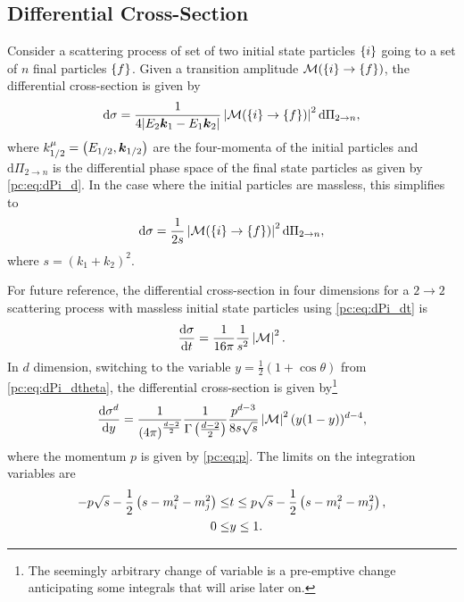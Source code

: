 \documentclass[../main.tex]{subfiles}
\begin{document}
\subsection{Differential Cross-Section}
Consider a scattering process of set of two initial state particles \(\left\{i\right\}\) going to a set of \(n\) final particles \(\left\{f\right\}\).
Given a transition amplitude \(\mathcal{M}(\left\{i\right\} \to \left\{f\right\})\), the differential cross-section is given by~\cite{Schwartz:2014sze}
\begin{equation}
  \mathrm{d}\sigma = \frac{1}{4|E_2 \boldsymbol{k}_1 - E_1\boldsymbol{k}_2|} \left|\mathcal{M}(\left\{i\right\} \to \left\{f\right\})\right|^2 \mathrm{d}\Pi_{2 \to n},
\end{equation}
where \(k_{1/2}^\mu = \left(E_{1/2}, \boldsymbol{k}_{1/2}\right)\) are the four-momenta of the initial particles and \(\mathrm{d}\Pi_{2 \to n}\) is the differential phase space of the final state particles as given by \cref{pc:eq:dPi_d}.
In the case where the initial particles are massless, this simplifies to
\begin{equation}
  \label{pc:eq:diff_xsec_formula}
  \mathrm{d}\sigma = \frac{1}{2s} \abs{\M(\cclosed{i} \to \cclosed{f})}^2 \mathrm{d}\Pi_{2 \to n},
\end{equation}
where \(s = (k_1 + k_2)^2\).

For future reference, the differential cross-section in four dimensions for a \(2\to 2\) scattering process with massless initial state particles using \cref{pc:eq:dPi_dt} is
\begin{equation}
  \label{pc:eq:dsigma_dt}
  \d[t]{\sigma} = \frac{1}{16\pi} \frac{1}{s^2} \abs{\M}^2.
\end{equation}
In \(d\) dimension, switching to the variable \(y = \frac{1}{2}(1+\cos\theta)\) from \cref{pc:eq:dPi_dtheta}, the differential cross-section is given by\footnote{The seemingly arbitrary change of variable is a pre-emptive change anticipating some integrals that will arise later on.}
\begin{equation}
  \label{pc:eq:dsigma_dy}
  \d[y]{\sigma^d} = \frac{1}{\pclosed{4\pi}^{\frac{d-2}{2}}} \frac{1}{\Gamma\pclosed{\frac{d-2}{2}}} \frac{p^{d-3}}{8s\sqrt{s}} \abs{\M}^2 (y(1-y))^{d-4},
\end{equation}
where the momentum \(p\) is given by \cref{pc:eq:p}.
The limits on the integration variables are
\begin{subequations}
  \begin{align}
    -p\sqrt{s} - \frac{1}{2}\left(s - m_i^2 - m_j^2\right) \leq & t \leq p\sqrt{s} - \frac{1}{2}\left(s - m_i^2 - m_j^2\right), \\
    0 \leq                                                   & y \leq 1.
  \end{align}
\end{subequations}
\end{document}
